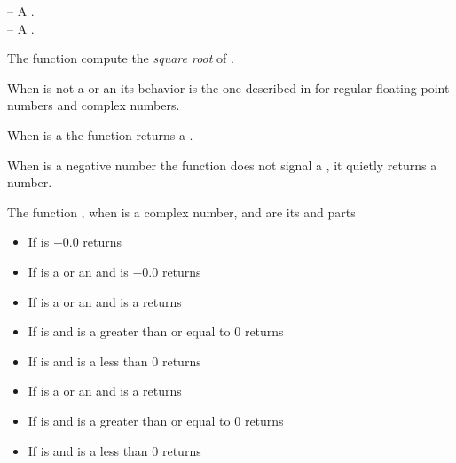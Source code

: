 \documentclass[../Comparisons-Predicates.tex]{subfiles}
\begin{document}

    \DSyntax{}

      \RArrow{} 

    \DArgsNValues{}

     -- A .\\
     -- A .

    \DDescription{}

    The function  compute the \emph{square root} of .

    \noindent
    When  is not a  or an
     its behavior is the one described in
    \cite{1996:ANSIHyperSpec} for regular floating point numbers and complex
    numbers.

    \noindent
    When  is a  the function 
    returns a
    .

    \noindent
    When  is a negative 
    number the function  does not signal a
    , it quietly returns a
     number.

    \noindent
    The function , when  is a complex number, 
    and  are its  and  parts
    \begin{itemize}
        \item If  is $-0.0$ returns 
        \code{))}
        \item If  is a  or an
         and
         is
$-0.0$ returns 
        \item If  is a  or an
         and
         is a
         returns 
        \item If  is  and
         is a greater than or equal to $0$ returns 
        \item If  is  and
         is a less than $0$ returns 
        \item If  is a  or an
         and
         is a
         returns 
        \item If  is  and
         is a greater than or equal to $0$ returns 
        \item If  is  and
         is a less than $0$ returns 
    \end{itemize}
\end{document}
